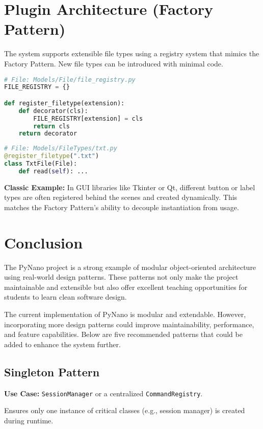 \documentclass[12pt]{article}
\begin{document}
\newpage

\section{Plugin Architecture (Factory Pattern)}
The system supports extensible file types using a registry system that mimics the Factory Pattern. New file types can be introduced with minimal code.

\begin{lstlisting}[language=Python]
# File: Models/File/file_registry.py
FILE_REGISTRY = {}

def register_filetype(extension):
    def decorator(cls):
        FILE_REGISTRY[extension] = cls
        return cls
    return decorator
\end{lstlisting}

\begin{lstlisting}[language=Python]
# File: Models/FileTypes/txt.py
@register_filetype(".txt")
class TxtFile(File):
    def read(self): ...
\end{lstlisting}

\textbf{Classic Example:} In GUI libraries like Tkinter or Qt, different button or label types are often registered behind the scenes and created dynamically. This matches the Factory Pattern's ability to decouple instantiation from usage.

\section{Conclusion}
The PyNano project is a strong example of modular object-oriented architecture using real-world design patterns. These patterns not only make the project maintainable and extensible but also offer excellent teaching opportunities for students to learn clean software design.

The current implementation of PyNano is modular and extendable. However, incorporating more design patterns could improve maintainability, performance, and feature capabilities. Below are five recommended patterns that could be added to enhance the system further.

\subsection{Singleton Pattern}
\textbf{Use Case:} \texttt{SessionManager} or a centralized \texttt{CommandRegistry}.

Ensures only one instance of critical classes (e.g., session manager) is created during runtime.
\end{document}
